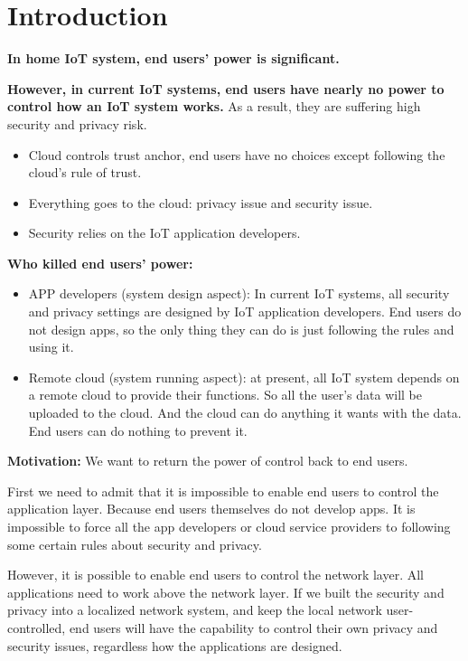 \section{Introduction}
\textbf{In home IoT system, end users' power is significant.}

\textbf{However, in current IoT systems, end users have nearly no power to control how an IoT system works.} 
As a result, they are suffering high security and privacy risk.
\begin{itemize}
	\item Cloud controls trust anchor, end users have no choices except following the cloud's rule of trust. 
	\item Everything goes to the cloud: privacy issue and security issue.
	\item Security relies on the IoT application developers.
\end{itemize}

\textbf{Who killed end users' power: }
\begin{itemize}
	\item APP developers (system design aspect): In current IoT systems, all security and privacy settings are designed by IoT application developers. End users do not design apps, so the only thing they can do is just following the rules and using it.
	\item Remote cloud (system running aspect): at present, all IoT system depends on a remote cloud to provide their functions. So all the user's data will be uploaded to the cloud. And the cloud can do anything it wants with the data. End users can do nothing to prevent it.
\end{itemize}

\textbf{Motivation:} We want to return the power of control back to end users.

First we need to admit that it is impossible to enable end users to control the application layer. Because end users themselves do not develop apps. It is impossible to force all the app developers or cloud service providers to following some certain rules about security and privacy.

However, it is possible to enable end users to control the network layer. All applications need to work above the network layer. If we built the security and privacy into a localized network system, and keep the local network user-controlled, end users will have the capability to control their own privacy and security issues, regardless how the applications are designed.

